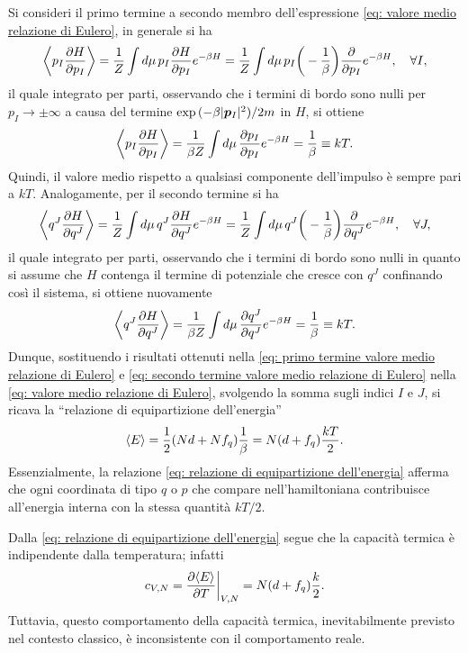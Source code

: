 Si consideri il primo termine a secondo membro dell'espressione \eqref{eq: valore medio relazione di Eulero}, in generale si ha
\begin{equation}
    \left\langle p_I\frac{\partial H}{\partial p_I} \right\rangle = \frac{1}{Z}\int d\mu\,p_I\frac{\partial H}{\partial p_I}e^{-\beta H} =  \frac{1}{Z}\int d\mu\, p_I\bigg(-\frac{1}{\beta}\bigg)\frac{\partial }{\partial p_I}e^{-\beta H},\quad\forall I,
\end{equation}
il quale integrato per parti, osservando che i termini di bordo sono nulli per $p_I\to\pm\infty$ a causa del termine $\exp{(-\beta|\bm{p}_I|^2)/2m}$ in $H$, si ottiene
\begin{equation}
    \left\langle p_I\frac{\partial H}{\partial p_I} \right\rangle = \frac{1}{\beta Z}\int d\mu\,\frac{\partial p_I}{\partial p_I}e^{-\beta H} = \frac{1}{\beta} \equiv kT.
\end{equation}
Quindi, il valore medio rispetto a qualsiasi componente dell'impulso è sempre pari a $kT$. Analogamente, per il secondo termine si ha
\begin{equation}
\label{eq: primo termine valore medio relazione di Eulero}
    \left\langle q^J\frac{\partial H}{\partial q^J} \right\rangle = \frac{1}{Z}\int d\mu\,q^J\frac{\partial H}{\partial q^J}e^{-\beta H} =  \frac{1}{Z}\int d\mu\,q^J\bigg(-\frac{1}{\beta}\bigg)\frac{\partial}{\partial q^J}e^{-\beta H},\quad\forall J,
\end{equation}
il quale integrato per parti, osservando che i termini di bordo sono nulli in quanto si assume che $H$ contenga il termine di potenziale che cresce con $q^J$ confinando così il sistema, si ottiene nuovamente
\begin{equation}
\label{eq: secondo termine valore medio relazione di Eulero}
    \left\langle q^J\frac{\partial H}{\partial q^J} \right\rangle = \frac{1}{\beta Z}\int d\mu\,\frac{\partial q^J}{\partial q^J}e^{-\beta H} = \frac{1}{\beta} \equiv kT.
\end{equation}
Dunque, sostituendo i risultati ottenuti nella \eqref{eq: primo termine valore medio relazione di Eulero} e \eqref{eq: secondo termine valore medio relazione di Eulero} nella \eqref{eq: valore medio relazione di Eulero}, svolgendo la somma sugli indici $I$ e $J$, si ricava la ``relazione di equipartizione dell'energia'' 
\begin{equation}
\label{eq: relazione di equipartizione dell'energia}
    \langle E \rangle = \frac{1}{2}(Nd + Nf_q)\frac{1}{\beta} = N(d + f_q)\frac{kT}{2}.
\end{equation}
Essenzialmente, la relazione \eqref{eq: relazione di equipartizione dell'energia} afferma che ogni coordinata di tipo $q$ o $p$ che compare nell'hamiltoniana contribuisce all'energia interna con la stessa quantità $kT/2$. 
\begin{obs}
    Dalla \eqref{eq: relazione di equipartizione dell'energia} segue che la capacità termica è indipendente dalla temperatura; infatti
    \begin{equation}
        c_{V,N} = \frac{\partial \langle E \rangle}{\partial T}\bigg|_{V,N} = N(d + f_q)\frac{k}{2}.
    \end{equation}
    Tuttavia, questo comportamento della capacità termica, inevitabilmente previsto nel contesto classico, è inconsistente con il comportamento reale.
\end{obs}

